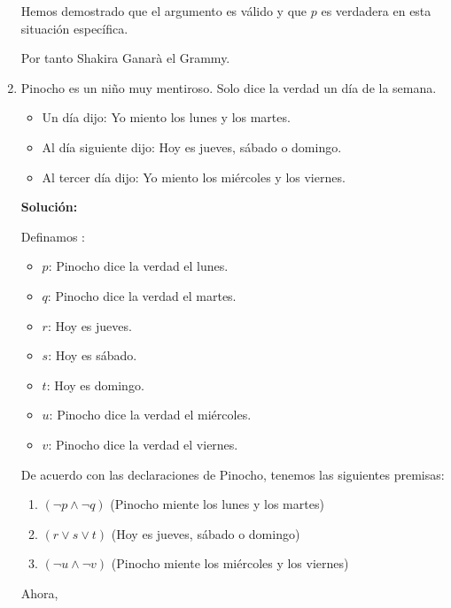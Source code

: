\documentclass{article}
\begin{document}
\begin{enumerate}
Hemos demostrado que el argumento es válido y que \(p\) es verdadera en esta situación específica.

Por tanto Shakira Ganarà el Grammy.

  \item  Pinocho es un niño muy mentiroso. Solo dice la verdad un día de la semana.



\begin{enumerate}
    
    \begin{itemize}
        \item Un día dijo: Yo miento los lunes y los martes.
        \item Al día siguiente dijo: Hoy es jueves, sábado o domingo.
        \item Al tercer día dijo: Yo miento los miércoles y los viernes.
    \end{itemize}
    
    \textbf{Solución:}
    
    Definamos :
    
    \begin{itemize}
        \item $p$: Pinocho dice la verdad el lunes.
        \item $q$: Pinocho dice la verdad el martes.
        \item $r$: Hoy es jueves.
        \item $s$: Hoy es sábado.
        \item $t$: Hoy es domingo.
        \item $u$: Pinocho dice la verdad el miércoles.
        \item $v$: Pinocho dice la verdad el viernes.
    \end{itemize}
    
    De acuerdo con las declaraciones de Pinocho, tenemos las siguientes premisas:
    
    \begin{enumerate}
        \item $(\neg p \land \neg q)$ \quad (Pinocho miente los lunes y los martes)
        \item $(r \lor s \lor t)$ \quad (Hoy es jueves, sábado o domingo)
        \item $(\neg u \land \neg v)$ \quad (Pinocho miente los miércoles y los viernes)
    \end{enumerate}
    
    Ahora,
    

\end{enumerate}
\end{enumerate}
\end{document}
